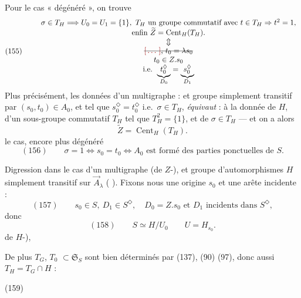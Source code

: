 \documentclass[11pt,a4paper]{article}
\begin{document}
Pour le cas « dégénéré », on trouve
\[
(155)\qquad
\begin{array}{c}
\sigma\in T_H \Longrightarrow U_0=U_1=\{1\},\ T_H \text{ un groupe commutatif avec } t\in T_H\Rightarrow t^2=1,\\
\text{enfin } \widetilde{Z}=\operatorname{Cent}_H(T_H).\\
\Updownarrow\\
\text{\struck{\ill{}, $t_0=\lambda s_0$}}\\
t_0\in Z.s_0\\
\text{i.e. } \underbrace{t_0^{\Diamond}}_{D_0}=\underbrace{s_0^{\Diamond}}_{D_1}
\end{array}
\]
Plus précisément, les données d'un multigraphe :  et groupe simplement
transitif  \struck{\ill{}} \ill{} par $(s_0,t_0)\in A_0$, et tel que
 $s_0^{\Diamond}=t_0^{\Diamond}$ i.e.\ $\sigma\in T_H$,
\emph{équivaut} : à la donnée de $H$, d'un sous-groupe commutatif $T_H$ tel que $T_H^2=\{1\}$, et
de $\sigma\in T_H$ --- et on a alors
\[
\widetilde{Z}=\operatorname{Cent}_H(T_H).
\]
  le cas, encore plus dégénéré
\[
(156)\qquad \sigma=1 \iff s_0=t_0 \iff A_0 \text{ est formé des parties ponctuelles de } S .
\]


Digression dans le cas d'un multigraphe  (de $Z$-), et groupe
d'automorphismes $H$ simplement transitif sur   $\vec{A}_\lambda$
( \ill{}). Fixons nous une origine $s_0$ et une arête incidente :
\[
(157)\qquad s_0\in S,\ D_1\in S^{\Diamond},\quad D_0=Z.s_0 \text{ et } D_1 \text{ incidents dans } S^{\Diamond},
\]
donc
\[
(158)\qquad S\simeq H/U_0 \qquad U=H_{s_0} .
\]
 de $H$-),

 De plus $T_G$, $T_0$ \struck{\ill{}} $\subset\mathfrak{S}_S$ sont bien
déterminés par (137),  \ill{} (90) (97), donc aussi
$T_H=T_G\cap H$ :

(159)
\end{document}
